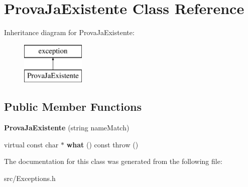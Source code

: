 \hypertarget{class_prova_ja_existente}{}\section{Prova\+Ja\+Existente Class Reference}
\label{class_prova_ja_existente}
Inheritance diagram for Prova\+Ja\+Existente\+:\begin{figure}[H]
\begin{center}
\leavevmode
\includegraphics[height=2.000000cm]{class_prova_ja_existente}
\end{center}
\end{figure}
\subsection*{Public Member Functions}
\begin{DoxyCompactItemize}
\item 
\hypertarget{class_prova_ja_existente_a06725a8d51855c01a51647b54320db51}{}{\bfseries Prova\+Ja\+Existente} (string name\+Match)\label{class_prova_ja_existente_a06725a8d51855c01a51647b54320db51}

\item 
\hypertarget{class_prova_ja_existente_a04840dd71409c57e714da57fee392beb}{}virtual const char $\ast$ {\bfseries what} () const   throw ()\label{class_prova_ja_existente_a04840dd71409c57e714da57fee392beb}

\end{DoxyCompactItemize}


The documentation for this class was generated from the following file\+:\begin{DoxyCompactItemize}
\item 
src/Exceptions.\+h\end{DoxyCompactItemize}
